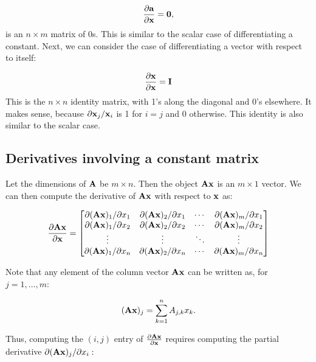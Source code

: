 \begin{equation}\frac{\partial {\bf a}}{\partial {\bf x}} = {\bf 0},
  \label{eq:const}
\end{equation}
is an $n \times m$ matrix of 0s. This is similar to the scalar case of differentiating a constant. Next, we can consider the case of differentiating a vector with respect to itself:

\begin{equation}\frac{\partial {\bf x}}{\partial {\bf x}} = {\bf I}\end{equation}
This is the $n \times n$ identity matrix, with 1's along the
diagonal and 0's elsewhere.  It makes sense, because $\partial {\bf x}_j /
  {\bf x}_i$ is 1 for $i = j$ and 0 otherwise. This identity is also similar to the scalar case.

\subsection{Derivatives involving a constant matrix}

Let the dimensions of ${\bf A}$ be $m \times n$. Then the object ${\bf A} {\bf x}$ is an $m\times 1$ vector.
We can then compute the derivative of ${\bf A} {\bf x}$ with respect to ${\bf x}$ as:

\begin{equation}\frac{\partial {\bf A} {\bf x}}{\partial {\bf x}} = \begin{bmatrix}
    \partial ({\bf A} {\bf x})_1/\partial x_1 & \partial ({\bf A} {\bf x})_2/\partial x_1 & \cdots & \partial ({\bf A} {\bf x})_m/\partial x_1 \\
    \partial ({\bf A} {\bf x})_1/\partial x_2 & \partial ({\bf A} {\bf x})_2/\partial x_2 & \cdots & \partial ({\bf A} {\bf x})_m/\partial x_2 \\
    \vdots                            & \vdots                            & \ddots & \vdots                            \\
    \partial ({\bf A} {\bf x})_1/\partial x_n & \partial ({\bf A} {\bf x})_2/\partial x_n & \cdots & \partial ({\bf A} {\bf x})_m/\partial x_n \\
  \end{bmatrix}
\end{equation}

\noindent Note that any element of the column vector ${\bf A} {\bf x}$ can be written as, for $j = 1, \ldots, m$:

\[ ({\bf A} {\bf x})_j = \sum_{k=1}^n A_{j,k} x_k.\]

\noindent Thus, computing the $(i,j)$ entry of $\frac{\partial {\bf A} {\bf x}}{\partial {\bf x}}$ requires computing the partial derivative $\partial ({\bf A} {\bf x})_j/\partial x_i:$

